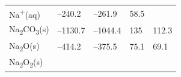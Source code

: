 \documentclass[
  9pt,
]{extbook}
\theoremstyle{definition}
\theoremstyle{definition}
\theoremstyle{definition}
\theoremstyle{remark}
\begin{document}
\begin{longtable}[]{@{}lllll@{}}
\begin{minipage}[t]{0.10\columnwidth}
Na\textsuperscript{+}(aq)\strut
\end{minipage} & \begin{minipage}[t]{0.19\columnwidth}\raggedright
--240.2\strut
\end{minipage} & \begin{minipage}[t]{0.20\columnwidth}\raggedright
--261.9\strut
\end{minipage} & \begin{minipage}[t]{0.18\columnwidth}\raggedright
58.5\strut
\end{minipage} & \begin{minipage}[t]{0.18\columnwidth}\raggedright
\strut
\end{minipage}\tabularnewline
\begin{minipage}[t]{0.10\columnwidth}\raggedright
Na\textsubscript{2}CO\textsubscript{3}(s)\strut
\end{minipage} & \begin{minipage}[t]{0.19\columnwidth}\raggedright
--1130.7\strut
\end{minipage} & \begin{minipage}[t]{0.20\columnwidth}\raggedright
--1044.4\strut
\end{minipage} & \begin{minipage}[t]{0.18\columnwidth}\raggedright
135\strut
\end{minipage} & \begin{minipage}[t]{0.18\columnwidth}\raggedright
112.3\strut
\end{minipage}\tabularnewline
\begin{minipage}[t]{0.10\columnwidth}\raggedright
Na\textsubscript{2}O(s)\strut
\end{minipage} & \begin{minipage}[t]{0.19\columnwidth}\raggedright
--414.2\strut
\end{minipage} & \begin{minipage}[t]{0.20\columnwidth}\raggedright
--375.5\strut
\end{minipage} & \begin{minipage}[t]{0.18\columnwidth}\raggedright
75.1\strut
\end{minipage} & \begin{minipage}[t]{0.18\columnwidth}\raggedright
69.1\strut
\end{minipage}\tabularnewline
\begin{minipage}[t]{0.10\columnwidth}\raggedright
Na\textsubscript{2}O\textsubscript{2}(s)\strut
\end{minipage} & \begin{minipage}[t]{0.19\columnwidth}\raggedright

\end{minipage}
\end{longtable}
\end{document}
